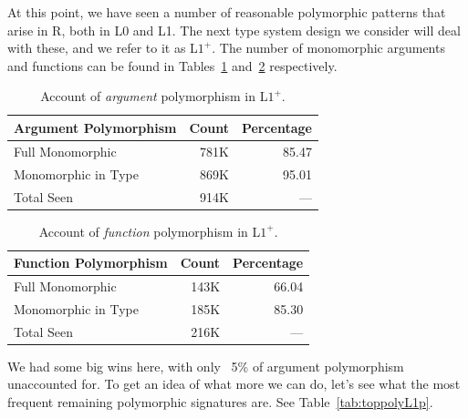 \documentclass[acmsmall,10pt,review,anonymous]{acmart}\settopmatter{printfolios=true,printccs=false,printacmref=false}
\begin{document}
At this point, we have seen a number of reasonable polymorphic patterns that arise in R, both in L0 and L1.
The next type system design we consider will deal with these, and we refer to it as L$1^{+}$.
The number of monomorphic arguments and functions can be found in Tables~\ref{tab:argcountsL1p} and~\ref{tab:funcountsL1p} respectively.

\begin{table}[ht]
\label{tab:argcountsL1p}
\centering
\begin{tabular}{lrr}
  \hline
 Argument Polymorphism & Count & Percentage \\ 
  \hline
  Full Monomorphic & 781K & 85.47 \\
  Monomorphic in Type & 869K & 95.01 \\
  Total Seen & 914K & --- \\ 
     \hline
\end{tabular}
\caption{Account of {\it argument} polymorphism in L$1^{+}$.}
\end{table}

\begin{table}[ht]
\label{tab:funcountsL1p}
\centering
\begin{tabular}{lrr}
  \hline
 Function Polymorphism & Count & Percentage \\ 
  \hline
  Full Monomorphic & 143K & 66.04 \\ 
  Monomorphic in Type & 185K & 85.30 \\
  Total Seen & 216K & --- \\ 
   \hline
\end{tabular}
\caption{Account of {\it function} polymorphism in L$1^{+}$.}
\end{table}

We had some big wins here, with only ~5\% of argument polymorphism unaccounted for.
To get an idea of what more we can do, let's see what the most frequent remaining polymorphic signatures are.
See Table~\ref{tab:toppolyL1p}.
\end{document}

